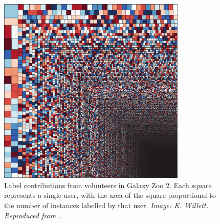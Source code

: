     \begin{figure}
        \centering
        \includegraphics[width=0.8\textwidth]{images/galaxyzoovolunteers}
        \caption{Label contributions from volunteers in Galaxy Zoo 2. Each
            square represents a single user, with the area of the square
            proportional to the number of instances labelled by that user.
            \emph{Image: K. Willett. Reproduced from \citet{marshall15}.}}
        \label{fig:galaxy-zoo-2-volunteer-distribution}
    \end{figure}

